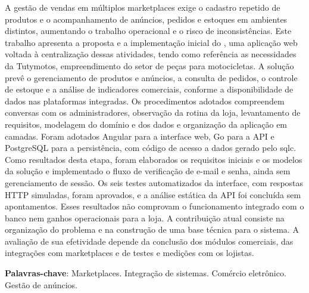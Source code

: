 \begin{resumo}
A gestão de vendas em múltiplos marketplaces exige o cadastro repetido de produtos e o acompanhamento de anúncios, pedidos e estoques em ambientes distintos, aumentando o trabalho operacional e o risco de inconsistências. Este trabalho apresenta a proposta e a implementação inicial do \sistema{}, uma aplicação web voltada à centralização dessas atividades, tendo como referência as necessidades da Tutymotos, empreendimento do setor de peças para motocicletas. A solução prevê o gerenciamento de produtos e anúncios, a consulta de pedidos, o controle de estoque e a análise de indicadores comerciais, conforme a disponibilidade de dados nas plataformas integradas. Os procedimentos adotados compreendem conversas com os administradores, observação da rotina da loja, levantamento de requisitos, modelagem do domínio e dos dados e organização da aplicação em camadas. Foram adotados Angular para a interface web, Go para a API e PostgreSQL para a persistência, com código de acesso a dados gerado pelo sqlc. Como resultados desta etapa, foram elaborados os requisitos iniciais e os modelos da solução e implementado o fluxo de verificação de e-mail e senha, ainda sem gerenciamento de sessão. Os seis testes automatizados da interface, com respostas HTTP simuladas, foram aprovados, e a análise estática da API foi concluída sem apontamentos. Esses resultados não comprovam o funcionamento integrado com o banco nem ganhos operacionais para a loja. A contribuição atual consiste na organização do problema e na construção de uma base técnica para o sistema. A avaliação de sua efetividade depende da conclusão dos módulos comerciais, das integrações com marketplaces e de testes e medições com os lojistas.

\vspace{\onelineskip}
\noindent
\textbf{Palavras-chave}: Marketplaces. Integração de sistemas. Comércio eletrônico. Gestão de anúncios.
\end{resumo}
